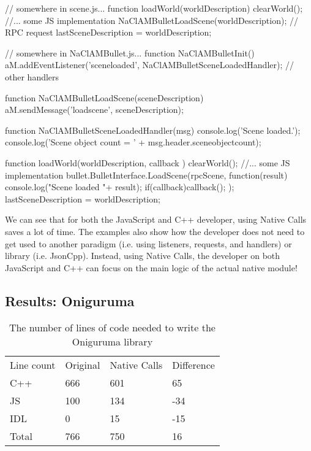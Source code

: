 \begin{code}
// somewhere in scene.js... 
function loadWorld(worldDescription) {
  clearWorld();
  //... some JS implementation
  NaClAMBulletLoadScene(worldDescription); // RPC request
  lastSceneDescription = worldDescription;
}

// somewhere in NaClAMBullet.js...
function NaClAMBulletInit() {
  aM.addEventListener('sceneloaded', NaClAMBulletSceneLoadedHandler);
  // other handlers
}

function NaClAMBulletLoadScene(sceneDescription) {
  aM.sendMessage('loadscene', sceneDescription);
}

function NaClAMBulletSceneLoadedHandler(msg) {
  console.log('Scene loaded.');
  console.log('Scene object count = ' + msg.header.sceneobjectcount);
}
\end{code}

\begin{code}
function loadWorld(worldDescription, callback ) {
  clearWorld();
  //... some JS implementation
  bullet.BulletInterface.LoadScene(rpcScene, function(result){
    console.log("Scene loaded "+ result);
    if(callback)callback();
  });
  lastSceneDescription = worldDescription;
}
\end{code}

We can see that for both the JavaScript and C++ developer, using Native Calls saves a lot of time. The examples also show how the developer does not need to get used to another paradigm (i.e. using listeners, requests, and handlers) or library (i.e. JsonCpp). Instead, using Native Calls, the developer on both JavaScript and C++ can focus on the main logic of the actual native module!


\subsection{Results: Oniguruma} %
\label{sub:evaluation_usability_oniguruma}
\begin{table}[h]
\centering
\begin{tabular}{llll}
Line count                 & Original & Native Calls & Difference \\ \cline{2-4} 
\multicolumn{1}{l|}{C++}   & 666      & 601          &  65        \\
\multicolumn{1}{l|}{JS}    & 100      & 134          &  -34       \\
\multicolumn{1}{l|}{IDL}   & 0        & 15           &  -15       \\
\multicolumn{1}{l|}{Total} & 766      & 750          &  16
\end{tabular}
\caption{The number of lines of code needed to write the Oniguruma library}
\label{table:eval_usability_results_onig}
\end{table}


